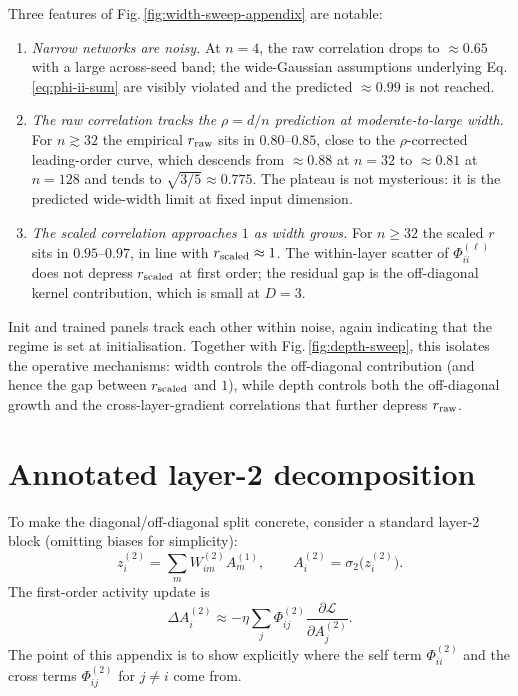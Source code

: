 \documentclass[10pt]{article}
\newcommand{\loss}{\mathcal{L}}
\begin{document}
Three features of Fig.\,\ref{fig:width-sweep-appendix} are notable:
\begin{enumerate}
    \setlength\itemsep{0pt}
  \item \emph{Narrow networks are noisy.}  At $n=4$, the raw correlation drops to $\approx 0.65$ with a large across-seed band; the wide-Gaussian assumptions underlying Eq.\,\ref{eq:phi-ii-sum} are visibly violated and the predicted $\approx 0.99$ is not reached.
  \item \emph{The raw correlation tracks the $\rho=d/n$ prediction at moderate-to-large width.}  For $n\gtrsim 32$ the empirical $r_{\rm raw}$ sits in $0.80$--$0.85$, close to the $\rho$-corrected leading-order curve, which descends from $\approx 0.88$ at $n=32$ to $\approx 0.81$ at $n=128$ and tends to $\sqrt{3/5}\approx 0.775$.  The plateau is not mysterious: it is the predicted wide-width limit at fixed input dimension.
  \item \emph{The scaled correlation approaches $1$ as width grows.}  For $n\ge 32$ the scaled $r$ sits in $0.95$--$0.97$, in line with $r_{\rm scaled}\approx 1$.  The within-layer scatter of $\Phi^{(\ell)}_{ii}$ does not depress $r_{\rm scaled}$ at first order; the residual gap is the off-diagonal kernel contribution, which is small at $D=3$.
\end{enumerate}
Init and trained panels track each other within noise, again indicating that the regime is set at initialisation.  Together with Fig.\,\ref{fig:depth-sweep}, this isolates the operative mechanisms: width controls the off-diagonal contribution (and hence the gap between $r_{\rm scaled}$ and $1$), while depth controls both the off-diagonal growth and the cross-layer-gradient correlations that further depress $r_{\rm raw}$.

\section{Annotated layer-2 decomposition}

To make the diagonal/off-diagonal split concrete, consider a standard layer-2 block (omitting biases for simplicity):
\[
  z_i^{(2)} = \sum_m W_{im}^{(2)} A_m^{(1)},
  \qquad
  A_i^{(2)} = \sigma_2\!\bigl(z_i^{(2)}\bigr).
\]
The first-order activity update is
\[
  \Delta A_i^{(2)}
  \approx
  -\eta \sum_j \Phi_{ij}^{(2)} \frac{\partial \loss}{\partial A_j^{(2)}}.
\]
The point of this appendix is to show explicitly where the self term $\Phi_{ii}^{(2)}$ and the cross terms $\Phi_{ij}^{(2)}$ for $j\neq i$ come from.
\end{document}
